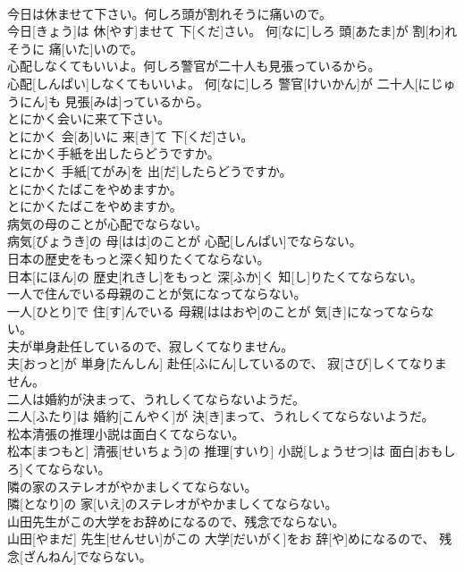 \documentclass[8pt]{extreport}
\begin{document}
\begin{CJK}{UTF8}{min}
\\	今日は休ませて下さい。何しろ頭が割れそうに痛いので。	
\\	今日[きょう]は 休[やす]ませて 下[くだ]さい。 何[なに]しろ 頭[あたま]が 割[わ]れそうに 痛[いた]いので。
\\	心配しなくてもいいよ。何しろ警官が二十人も見張っているから。	
\\	心配[しんぱい]しなくてもいいよ。 何[なに]しろ 警官[けいかん]が 二十人[にじゅうにん]も 見張[みは]っているから。
\\	とにかく会いに来て下さい。	
\\	とにかく 会[あ]いに 来[き]て 下[くだ]さい。
\\	とにかく手紙を出したらどうですか。	
\\	とにかく 手紙[てがみ]を 出[だ]したらどうですか。
\\	とにかくたばこをやめますか。	
\\	とにかくたばこをやめますか。
\\	病気の母のことが心配でならない。	
\\	病気[びょうき]の 母[はは]のことが 心配[しんぱい]でならない。
\\	日本の歴史をもっと深く知りたくてならない。	
\\	日本[にほん]の 歴史[れきし]をもっと 深[ふか]く 知[し]りたくてならない。
\\	一人で住んでいる母親のことが気になってならない。	
\\	一人[ひとり]で 住[す]んでいる 母親[ははおや]のことが 気[き]になってならない。
\\	夫が単身赴任しているので、寂しくてなりません。	
\\	夫[おっと]が 単身[たんしん] 赴任[ふにん]しているので、 寂[さび]しくてなりません。
\\	二人は婚約が決まって、うれしくてならないようだ。	
\\	二人[ふたり]は 婚約[こんやく]が 決[き]まって、うれしくてならないようだ。
\\	松本清張の推理小説は面白くてならない。	
\\	松本[まつもと] 清張[せいちょう]の 推理[すいり] 小説[しょうせつ]は 面白[おもしろ]くてならない。
\\	隣の家のステレオがやかましくてならない。	
\\	隣[となり]の 家[いえ]のステレオがやかましくてならない。
\\	山田先生がこの大学をお辞めになるので、残念でならない。	
\\	山田[やまだ] 先生[せんせい]がこの 大学[だいがく]をお 辞[や]めになるので、 残念[ざんねん]でならない。

\end{CJK}
\end{document}

